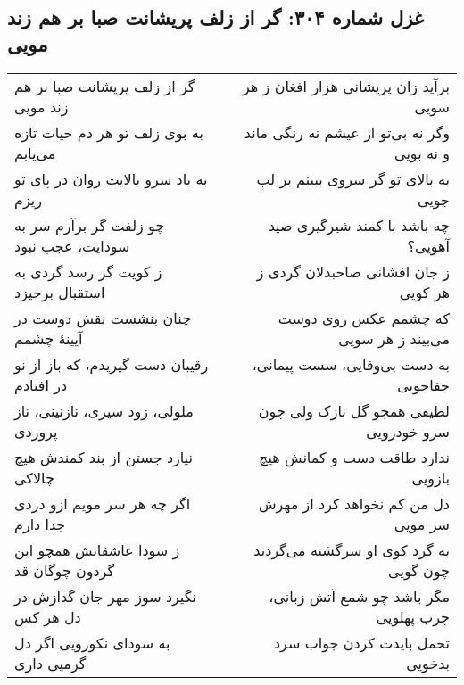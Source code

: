 \begin{center}
\section*{غزل شماره ۳۰۴: گر از زلف پریشانت صبا بر هم زند مویی}
\label{sec:304}
\begin{longtable}{l p{0.5cm} r}
گر از زلف پریشانت صبا بر هم زند مویی
&&
برآید زان پریشانی هزار افغان ز هر سویی
\\
به بوی زلف تو هر دم حیات تازه می‌یابم
&&
وگر نه بی‌تو از عیشم نه رنگی ماند و نه بویی
\\
به یاد سرو بالایت روان در پای تو ریزم
&&
به بالای تو گر سروی ببینم بر لب جویی
\\
چو زلفت گر برآرم سر به سودایت، عجب نبود
&&
چه باشد با کمند شیرگیری صید آهویی؟
\\
ز کویت گر رسد گردی به استقبال برخیزد
&&
ز جان افشانی صاحبدلان گردی ز هر کویی
\\
چنان بنشست نقش دوست در آیینهٔ چشمم
&&
که چشمم عکس روی دوست می‌بیند ز هر سویی
\\
رقیبان دست گیریدم، که باز از نو در افتادم
&&
به دست بی‌وفایی، سست پیمانی، جفاجویی
\\
ملولی، زود سیری، نازنینی، ناز پروردی
&&
لطیفی همچو گل نازک ولی چون سرو خودرویی
\\
نیارد جستن از بند کمندش هیچ چالاکی
&&
ندارد طاقت دست و کمانش هیچ بازویی
\\
اگر چه هر سر مویم ازو دردی جدا دارم
&&
دل من کم نخواهد کرد از مهرش سر مویی
\\
ز سودا عاشقانش همچو این گردون چوگان قد
&&
به گرد کوی او سرگشته می‌گردند چون گویی
\\
نگیرد سوز مهر جان گدازش در دل هر کس
&&
مگر باشد چو شمع آتش زبانی، چرب پهلویی
\\
به سودای نکورویی اگر دل گرمیی داری
&&
تحمل بایدت کردن جواب سرد بدخویی
\\
\end{longtable}
\end{center}
